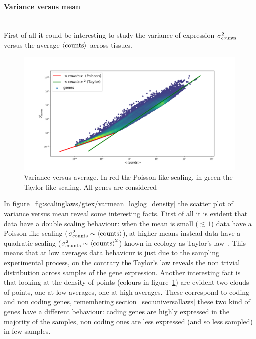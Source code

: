 \paragraph{Variance versus mean}\mbox{}\\
First of all it could be interesting to study the variance of expression $\sigma^2_{\mathrm{counts}}$ versus 
the average $\left\langle \mathrm{counts}\right\rangle$ across tissues.
\begin{figure}[htb!]
    \centering
    \includegraphics[width=0.9\linewidth]{pictures/scalinglaws/gtex/allgenes/varmean_loglog.png}
    \caption{Variance versus average. In red the Poisson-like scaling, in green the Taylor-like scaling. All genes are considered}
    \label{fig:scalinglaws/gtex/allgenes/varmean_loglog_density}
\end{figure}
In figure~\ref{fig:scalinglaws/gtex/varmean_loglog_density} the scatter plot of variance versus mean reveal some interesting facts.
First of all it is evident that data have a double scaling behaviour: when the mean is small ($\lesssim 1$) data have a Poisson-like scaling ($\sigma^2_{\mathrm{counts}} \sim \left\langle \mathrm{counts}\right\rangle$), at higher means instead data have a quadratic scaling ($\sigma^2_{\mathrm{counts}} \sim \left\langle \mathrm{counts}\right\rangle^2$) known in ecology as Taylor's law~\cite{Eisler2008}. This means that at low averages data behaviour is just due to the sampling experimental process, on the contrary the Taylor's law reveals the non trivial distribution across samples of the gene expression.
Another interesting fact is that looking at the density of points (colours in figure~\ref{fig:scalinglaws/gtex/allgenes/varmean_loglog_density}) are evident two clouds of points, one at low averages, one at high averages. These correspond to coding and non coding genes, remembering section~\ref{sec:universallaws} these two kind of genes have a different behaviour: coding genes are highly expressed in the majority of the samples, non coding ones are less expressed (and so less sampled) in few samples. 


